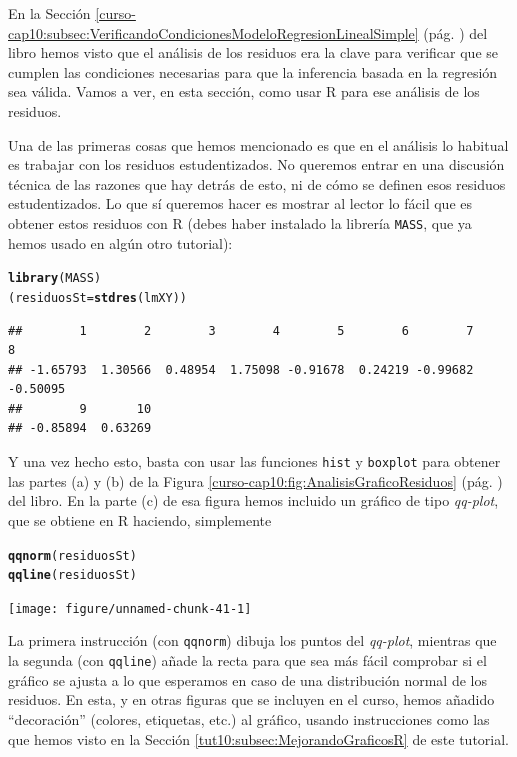 \documentclass[10pt,a4paper]{article}\usepackage[]{graphicx}\usepackage[]{color}
\makeatletter
\newcommand{\hlstd}[1]{\textcolor[rgb]{0.345,0.345,0.345}{#1}}%
\newcommand{\hlkwb}[1]{\textcolor[rgb]{0.69,0.353,0.396}{#1}}%
\newcommand{\hlkwd}[1]{\textcolor[rgb]{0.737,0.353,0.396}{\textbf{#1}}}%
\newenvironment{kframe}{%
 \def\at@end@of@kframe{}%
 \ifinner\ifhmode%
  \def\at@end@of@kframe{\end{minipage}}%
  \begin{minipage}{\columnwidth}%
 \fi\fi%
 \def\FrameCommand##1{\hskip\@totalleftmargin \hskip-\fboxsep
 \colorbox{shadecolor}{##1}\hskip-\fboxsep
     \hskip-\linewidth \hskip-\@totalleftmargin \hskip\columnwidth}%
 \MakeFramed {\advance\hsize-\width
   \@totalleftmargin\z@ \linewidth\hsize
   \@setminipage}}%
 {\par\unskip\endMakeFramed%
 \at@end@of@kframe}
\newenvironment{knitrout}{}{} %
\makeatother
\begin{document}
En la Sección \ref{curso-cap10:subsec:VerificandoCondicionesModeloRegresionLinealSimple} (pág. \pageref{curso-cap10:subsec:VerificandoCondicionesModeloRegresionLinealSimple}) del libro hemos visto que el análisis de los residuos era la clave para verificar que se cumplen las condiciones necesarias para que la inferencia basada en la regresión sea válida. Vamos a ver, en esta sección, como usar R para ese análisis de los residuos.

Una de las primeras cosas que hemos mencionado es que en el análisis lo habitual es trabajar con los residuos estudentizados. No queremos entrar en una discusión técnica de las razones que hay detrás de esto, ni de cómo se definen esos residuos estudentizados. Lo que sí queremos hacer es mostrar al lector lo fácil que es obtener estos residuos con R (debes haber instalado la librería {\tt MASS}, que ya hemos usado en algún otro tutorial):
\begin{knitrout}
\color{fgcolor}\begin{kframe}
\begin{alltt}
\hlkwd{library}\hlstd{(MASS)}
\hlstd{(residuosSt} \hlkwb{=} \hlkwd{stdres}\hlstd{(lmXY))}
\end{alltt}
\begin{verbatim}
##        1        2        3        4        5        6        7        8 
## -1.65793  1.30566  0.48954  1.75098 -0.91678  0.24219 -0.99682 -0.50095 
##        9       10 
## -0.85894  0.63269
\end{verbatim}
\end{kframe}
\end{knitrout}
Y una vez hecho esto, basta con usar las funciones {\tt hist}  y {\tt boxplot} para obtener las partes (a) y (b) de la Figura \ref{curso-cap10:fig:AnalisisGraficoResiduos} (pág. \pageref{curso-cap10:fig:AnalisisGraficoResiduos}) del libro. En la parte (c) de esa figura hemos incluido un gráfico de tipo {\em qq-plot}, que se obtiene en R haciendo, simplemente
\begin{center}
\begin{knitrout}
\color{fgcolor}\begin{kframe}
\begin{alltt}
\hlkwd{qqnorm}\hlstd{(residuosSt)}
\hlkwd{qqline}\hlstd{(residuosSt)}
\end{alltt}
\end{kframe}
\texttt{[image: figure/unnamed-chunk-41-1]} 

\end{knitrout}
\end{center}
La primera instrucción (con {\tt qqnorm}) dibuja los puntos del {\em qq-plot}, mientras que la segunda (con {\tt qqline}) añade la recta para que sea más fácil comprobar si el gráfico se ajusta a lo que esperamos en caso de una distribución normal de los residuos. En esta, y en otras figuras que se incluyen en el curso, hemos añadido ``decoración'' (colores, etiquetas, etc.) al gráfico, usando instrucciones como las que hemos visto en la Sección \ref{tut10:subsec:MejorandoGraficosR} de este tutorial.
\end{document}
